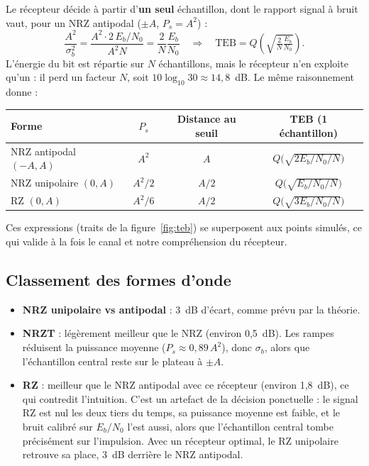 \documentclass[11pt,a4paper]{article}
\newcommand{\EbNo}{E_b/N_0}
\begin{document}
Le récepteur décide à partir d'\textbf{un seul} échantillon, dont le rapport signal à bruit vaut, pour un NRZ antipodal ($\pm A$, $P_s = A^2$) :
\[ \frac{A^2}{\sigma_b^2} = \frac{A^2\cdot 2\,\EbNo}{A^2 N} = \frac{2}{N}\frac{E_b}{N_0}
\quad\Longrightarrow\quad \text{TEB} = Q\!\left(\sqrt{\tfrac{2}{N}\tfrac{E_b}{N_0}}\right). \]
L'énergie du bit est répartie sur $N$ échantillons, mais le récepteur n'en exploite qu'un : il perd un facteur $N$, soit $10\log_{10}30\approx 14{,}8$~dB. Le même raisonnement donne :
\begin{center}\begin{tabular}{lccc}\toprule
Forme & $P_s$ & Distance au seuil & TEB (1 échantillon)\\\midrule
NRZ antipodal $(-A, A)$ & $A^2$ & $A$ & $Q\big(\sqrt{2\EbNo/N}\big)$\\
NRZ unipolaire $(0, A)$ & $A^2/2$ & $A/2$ & $Q\big(\sqrt{\EbNo/N}\big)$\\
RZ $(0, A)$ & $A^2/6$ & $A/2$ & $Q\big(\sqrt{3\EbNo/N}\big)$\\\bottomrule\end{tabular}\end{center}
Ces expressions (traits de la figure~\ref{fig:teb}) se superposent aux points simulés, ce qui valide à la fois le canal et notre compréhension du récepteur.

\subsection{Classement des formes d'onde}
\begin{itemize}
  \item \textbf{NRZ unipolaire vs antipodal} : 3~dB d'écart, comme prévu par la théorie.
  \item \textbf{NRZT} : légèrement meilleur que le NRZ (environ 0,5~dB). Les rampes réduisent la puissance moyenne ($P_s \approx 0{,}89\,A^2$), donc $\sigma_b$, alors que l'échantillon central reste sur le plateau à $\pm A$.
  \item \textbf{RZ} : meilleur que le NRZ antipodal avec ce récepteur (environ 1,8~dB), ce qui contredit l'intuition. C'est un artefact de la décision ponctuelle : le signal RZ est nul les deux tiers du temps, sa puissance moyenne est faible, et le bruit calibré sur $\EbNo$ l'est aussi, alors que l'échantillon central tombe précisément sur l'impulsion. Avec un récepteur optimal, le RZ unipolaire retrouve sa place, 3~dB derrière le NRZ antipodal.
\end{itemize}
\end{document}

